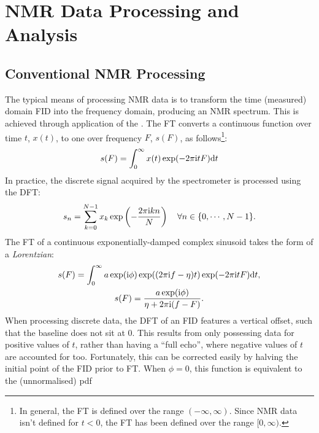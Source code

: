 \section{\acs{NMR} Data Processing and Analysis}

\subsection{Conventional NMR Processing}
\label{subsec:nmr-proc}
The typical means of processing \ac{NMR} data is to
transform the time (measured) domain \ac{FID} into the frequency domain,
producing an \ac{NMR} spectrum. This is achieved through application of the
. The \ac{FT} converts a continuous function over time $t$, $x(t)$, to
one over frequency $F$, $s(F)$, as follows\footnote{
    In general, the \ac{FT} is defined over the range $(-\infty, \infty)$.
    Since \ac{NMR} data isn't defined for $t < 0$, the \ac{FT} has been defined
    over the range  $[0, \infty)$.
}:
\begin{equation}
    s(F) =  \int_{0}^{\infty} x(t) \exp(
        -2 \pi \mathrm{i} t F
        ) \mathrm{d} t
\end{equation}
In practice, the discrete signal acquired by the spectrometer is processed
using the \ac{DFT}:
\begin{equation}
    s_n = \sum_{k=0}^{N-1} x_k \exp \left(
            -\frac{2 \pi \mathrm{i} k n}{N} \right)
            \quad \forall n \in \lbrace 0, \cdots, N-1 \rbrace.
\end{equation}
The \ac{FT} of a continuous exponentially-damped complex sinusoid
takes the form of a \emph{Lorentzian}:
\begin{subequations}
    \begin{gather}
        s(F) = \int_0^{\infty}
            a \exp(\mathrm{i} \phi) \exp((2 \pi \mathrm{i} f - \eta)t)
            \exp(-2 \pi \mathrm{i} t F)
            \mathrm{d} t,\\
        s(F) = \frac{a \exp(\mathrm{i} \phi) }
            {\eta + 2 \pi \mathrm{i} (f - F)}.
    \end{gather}
\end{subequations}
When processing discrete data, the \ac{DFT} of an \ac{FID}
features a vertical offset, such that the baseline does not sit at
0\cite{Tang1994}. This results from only possessing data for positive
values of $t$, rather than having a ``full echo'', where negative values of
$t$ are accounted for too. Fortunately, this can be corrected easily by
halving the initial point of the \ac{FID} prior to \ac{FT}.
When $\phi = 0$, this function is equivalent to the (unnormalised) \ac{pdf}
